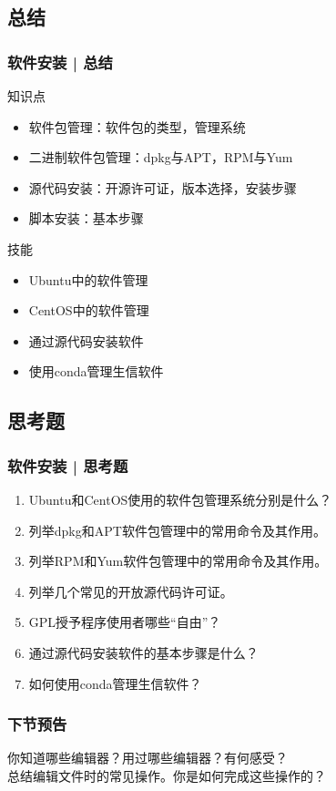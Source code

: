 \subsection{总结}
\begin{frame}
  \frametitle{软件安装 | 总结}
  \begin{block}{知识点}
    \begin{itemize}
      \item 软件包管理：软件包的类型，管理系统
      \item 二进制软件包管理：dpkg与APT，RPM与Yum
      \item 源代码安装：开源许可证，版本选择，安装步骤
      \item 脚本安装：基本步骤
    \end{itemize}
  \end{block}
  \begin{block}{技能}
    \begin{itemize}
      \item Ubuntu中的软件管理
      \item CentOS中的软件管理
      \item 通过源代码安装软件
      \item 使用conda管理生信软件
    \end{itemize}
  \end{block}
\end{frame}

\subsection{思考题}
\begin{frame}
  \frametitle{软件安装 | 思考题}
  \begin{enumerate}
    \item Ubuntu和CentOS使用的软件包管理系统分别是什么？
    \item 列举dpkg和APT软件包管理中的常用命令及其作用。
    \item 列举RPM和Yum软件包管理中的常用命令及其作用。
    \item 列举几个常见的开放源代码许可证。
    \item GPL授予程序使用者哪些“自由”？
    \item 通过源代码安装软件的基本步骤是什么？
    \item 如何使用conda管理生信软件？
  \end{enumerate}
\end{frame}

\begin{frame}
  \frametitle{下节预告}
  你知道哪些编辑器？用过哪些编辑器？有何感受？\\
  总结编辑文件时的常见操作。你是如何完成这些操作的？
\end{frame}




